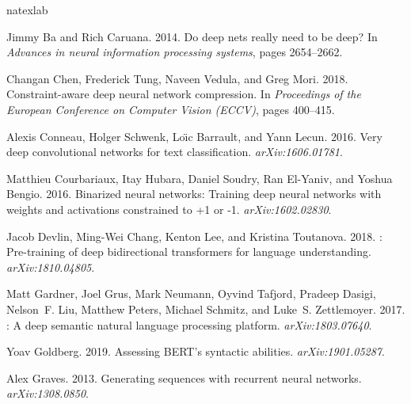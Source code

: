 \documentclass[11pt,a4paper]{article}
\begin{document}
\begin{thebibliography}{40}
\expandafter\ifx\csname natexlab\endcsname\relax\def\natexlab#1{#1}\fi

Jimmy Ba and Rich Caruana. 2014.
\newblock Do deep nets really need to be deep?
\newblock In \emph{Advances in neural information processing systems}, pages
  2654--2662.

Changan Chen, Frederick Tung, Naveen Vedula, and Greg Mori. 2018.
\newblock Constraint-aware deep neural network compression.
\newblock In \emph{Proceedings of the European Conference on Computer Vision
  (ECCV)}, pages 400--415.

Alexis Conneau, Holger Schwenk, Lo{\"\i}c Barrault, and Yann Lecun. 2016.
\newblock Very deep convolutional networks for text classification.
\newblock \emph{arXiv:1606.01781}.

Matthieu Courbariaux, Itay Hubara, Daniel Soudry, Ran El-Yaniv, and Yoshua
  Bengio. 2016.
\newblock Binarized neural networks: Training deep neural networks with weights
  and activations constrained to +1 or -1.
\newblock \emph{arXiv:1602.02830}.

Jacob Devlin, Ming-Wei Chang, Kenton Lee, and Kristina Toutanova. 2018.
: Pre-training of deep bidirectional transformers for language
  understanding.
\newblock \emph{arXiv:1810.04805}.

Matt Gardner, Joel Grus, Mark Neumann, Oyvind Tafjord, Pradeep Dasigi,
  Nelson~F. Liu, Matthew Peters, Michael Schmitz, and Luke~S. Zettlemoyer.
  2017.
: A deep semantic natural language processing platform.
\newblock \emph{arXiv:1803.07640}.

Yoav Goldberg. 2019.
\newblock Assessing {BERT}'s syntactic abilities.
\newblock \emph{arXiv:1901.05287}.

Alex Graves. 2013.
\newblock Generating sequences with recurrent neural networks.
\newblock \emph{arXiv:1308.0850}.


\end{thebibliography}
\end{document}
